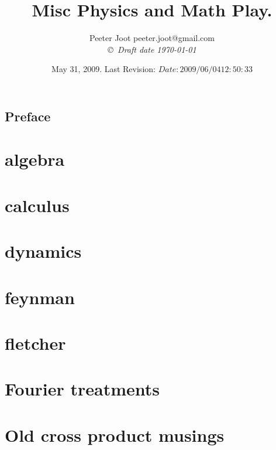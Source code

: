 \documentclass[12pt,leqno]{book}
\title{Misc Physics and Math Play.}
\author{Peeter Joot  \quad peeter.joot@gmail.com \\
{\small\em \copyright \  Draft date \today }}
\date{ May 31, 2009.  Last Revision: $Date: 2009/06/04 12:50:33 $ }
\begin{document}
\maketitle
\tableofcontents
\listoffigures
\listoftables
\chapter*{Preface}\normalsize
\pagestyle{plain}

%
\pagestyle{headings}


\part{algebra}





\part{calculus}





\part{dynamics}


\part{feynman}


\part{fletcher}


\part{Fourier treatments}


\part{Old cross product musings}


\end{document}
